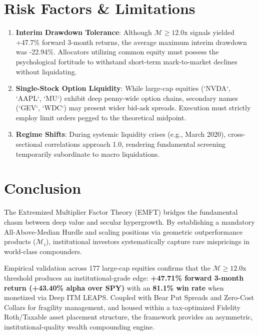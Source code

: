 \documentclass[11pt]{article}
\begin{document}
\section{Risk Factors \& Limitations}

\begin{enumerate}
    \item \textbf{Interim Drawdown Tolerance}: Although $\mathcal{M} \ge 12.0\text{x}$ signals yielded +47.7\% forward 3-month returns, the average maximum interim drawdown was -22.94\%. Allocators utilizing common equity must possess the psychological fortitude to withstand short-term mark-to-market declines without liquidating.
    \item \textbf{Single-Stock Option Liquidity}: While large-cap equities (`NVDA`, `AAPL`, `MU`) exhibit deep penny-wide option chains, secondary names (`GEV`, `WDC`) may present wider bid-ask spreads. Execution must strictly employ limit orders pegged to the theoretical midpoint.
    \item \textbf{Regime Shifts}: During systemic liquidity crises (e.g., March 2020), cross-sectional correlations approach 1.0, rendering fundamental screening temporarily subordinate to macro liquidations.
\end{enumerate}

\section{Conclusion}

The Extremized Multiplier Factor Theory (EMFT) bridges the fundamental chasm between deep value and secular hypergrowth. By establishing a mandatory All-Above-Median Hurdle and scaling positions via geometric outperformance products ($\mathcal{M}_i$), institutional investors systematically capture rare mispricings in world-class compounders. 

Empirical validation across 177 large-cap equities confirms that the $\mathcal{M} \ge 12.0\text{x}$ threshold produces an institutional-grade edge: \textbf{+47.71\% forward 3-month return (+43.40\% alpha over SPY)} with an \textbf{81.1\% win rate} when monetized via Deep ITM LEAPS. Coupled with Bear Put Spreads and Zero-Cost Collars for fragility management, and housed within a tax-optimized Fidelity Roth/Taxable asset placement structure, the framework provides an asymmetric, institutional-quality wealth compounding engine.
\end{document}
